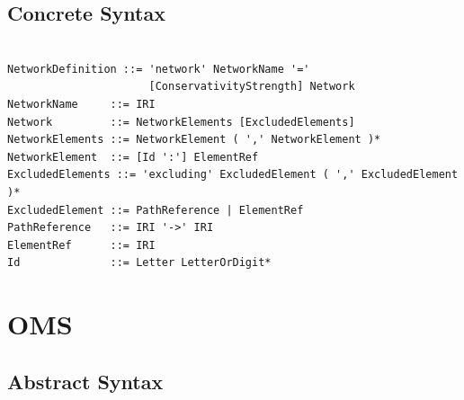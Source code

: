 \documentclass[10pt,fleqn,final]{scrreprt}
\newcommand{\sclause}[1]{\section{#1}}
\newcommand{\ssclause}[1]{\subsection{#1}}
\newenvironment{definitions}[0]{\medskip }{}
\begin{document}
\begin{definitions}
\ssclause{Concrete Syntax}

\vspace{-1.4em}
\begin{lstlisting}[language=ebnf,escapeinside={()},morecomment={[l]{\%\%\ }}]

NetworkDefinition ::= 'network' NetworkName '='
                      [ConservativityStrength] Network
NetworkName     ::= IRI
Network         ::= NetworkElements [ExcludedElements]
NetworkElements ::= NetworkElement ( ',' NetworkElement )*
NetworkElement  ::= [Id ':'] ElementRef
ExcludedElements ::= 'excluding' ExcludedElement ( ',' ExcludedElement )*
ExcludedElement ::= PathReference | ElementRef
PathReference   ::= IRI '->' IRI
ElementRef      ::= IRI
Id              ::= Letter LetterOrDigit*
\end{lstlisting}


\sclause{OMS}\label{c:OMS}
\ssclause{Abstract Syntax}


\end{definitions}
\end{document}
